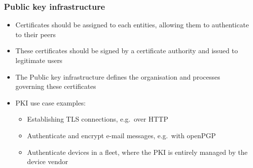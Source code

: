 \begin{frame}
  \frametitle{Public key infrastructure}
  \begin{itemize}
    \item Certificates should be assigned to each entities, allowing them to
      authenticate to their peers
    \item These certificates should be signed by a certificate authority and
      issued to legitimate users
    \item The Public key infrastructure defines the organisation and processes
      governing these certificates
    \item PKI use case examples:
      \begin{itemize}
        \item Establishing TLS connections, e.g.\ over HTTP
        \item Authenticate and encrypt e-mail messages, e.g.\ with openPGP
        \item Authenticate devices in a fleet, where the PKI is entirely managed
          by the device vendor
      \end{itemize}
  \end{itemize}
\end{frame}
